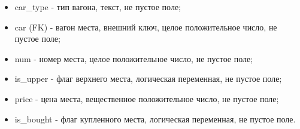 \begin{itemize}
            \item car\_type - тип вагона, текст, не пустое поле;
            \item car (FK) - вагон места, внешний ключ, целое положительное число, не пустое поле;
            \item num - номер места, целое положительное число, не пустое поле;
            \item is\_upper - флаг верхнего места, логическая переменная, не пустое поле;
            \item price - цена места, вещественное положительное число, не пустое поле;
            \item is\_bought - флаг купленного места, логическая переменная, не пустое поле. 
        \end{itemize}

\clearpage